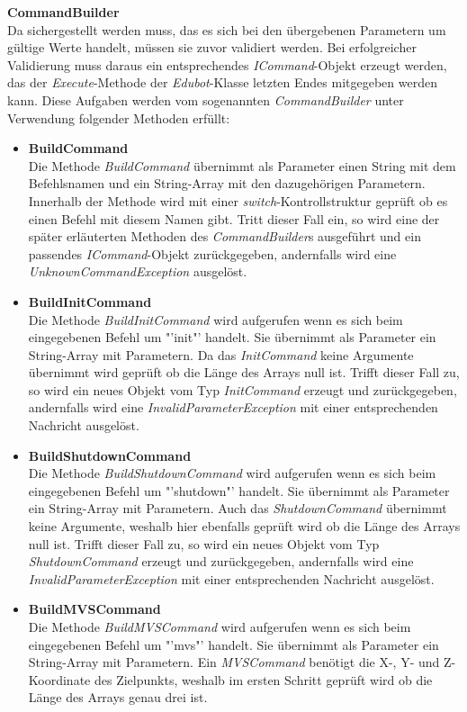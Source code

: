 \textbf{CommandBuilder}\\
Da sichergestellt werden muss, das es sich bei den übergebenen Parametern um gültige Werte handelt, müssen sie zuvor validiert werden. Bei erfolgreicher Validierung muss daraus ein entsprechendes \textit{ICommand}-Objekt erzeugt werden, das der \textit{Execute}-Methode der \textit{Edubot}-Klasse letzten Endes mitgegeben werden kann. Diese Aufgaben werden vom sogenannten \textit{CommandBuilder} unter Verwendung folgender Methoden erfüllt:
\begin{itemize}
\item \textbf{BuildCommand}\\
Die Methode \textit{BuildCommand} übernimmt als Parameter einen String mit dem Befehlsnamen und ein String-Array mit den dazugehörigen Parametern. Innerhalb der Methode wird mit einer \textit{switch}-Kontrollstruktur geprüft ob es einen Befehl mit diesem Namen gibt. Tritt dieser Fall ein, so wird eine der später erläuterten Methoden des \textit{CommandBuilder}s ausgeführt und ein passendes \textit{ICommand}-Objekt zurückgegeben, andernfalls wird eine \textit{UnknownCommandException} ausgelöst. 
\item \textbf{BuildInitCommand}\\
Die Methode \textit{BuildInitCommand} wird aufgerufen wenn es sich beim eingegebenen Befehl um "'init"' handelt. Sie übernimmt als Parameter ein String-Array mit Parametern. Da das \textit{InitCommand} keine Argumente übernimmt wird geprüft ob die Länge des Arrays null ist. Trifft dieser Fall zu, so wird ein neues Objekt vom Typ \textit{InitCommand} erzeugt und zurückgegeben, andernfalls wird eine \textit{InvalidParameterException} mit einer entsprechenden Nachricht ausgelöst.
\item \textbf{BuildShutdownCommand}\\
Die Methode \textit{BuildShutdownCommand} wird aufgerufen wenn es sich beim eingegebenen Befehl um "'shutdown"' handelt. Sie übernimmt als Parameter ein String-Array mit Parametern. Auch das \textit{ShutdownCommand} übernimmt keine Argumente, weshalb hier ebenfalls geprüft wird ob die Länge des Arrays null ist. Trifft dieser Fall zu, so wird ein neues Objekt vom Typ \textit{ShutdownCommand} erzeugt und zurückgegeben, andernfalls wird eine \textit{InvalidParameterException} mit einer entsprechenden Nachricht ausgelöst.
\item \textbf{BuildMVSCommand}\\
Die Methode \textit{BuildMVSCommand} wird aufgerufen wenn es sich beim eingegebenen Befehl um "'mvs"' handelt. Sie übernimmt als Parameter ein String-Array mit Parametern. Ein \textit{MVSCommand} benötigt die X-, Y- und Z-Koordinate des Zielpunkts, weshalb im ersten Schritt geprüft wird ob die Länge des Arrays genau drei ist.\\

\end{itemize}
